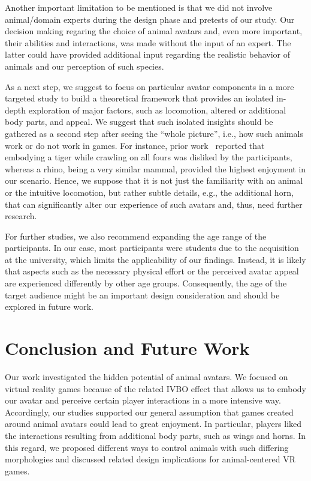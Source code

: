 \documentclass{sigchi}
\begin{document}
Another important limitation to be mentioned is that we did not involve animal/domain experts during the design phase and pretests of our study. Our decision making regaring the choice of animal avatars and, even more important, their abilities and interactions, was made without the input of an expert. The latter could have provided additional input regarding the realistic behavior of animals and our perception of such species.


As a next step, we suggest to focus on particular avatar components in a more targeted study to build a theoretical framework that provides an isolated in-depth exploration of major factors, such as locomotion, altered or additional body parts, and appeal. We suggest that such isolated insights should be gathered as a second step after seeing the “whole picture”, i.e., how such animals work or do not work in games. For instance, prior work~ reported that embodying a tiger while crawling on all fours was disliked by the participants, whereas a rhino, being a very similar mammal, provided the highest enjoyment in our scenario. Hence, we suppose that it is not just the familiarity with an animal or the intuitive locomotion, but rather subtle details, e.g., the additional horn, that can significantly alter our experience of such avatars and, thus, need further research. 


For further studies, we also recommend expanding the age range of the participants. In our case, most participants were students due to the acquisition at the university, which limits the applicability of our findings. Instead, it is likely that aspects such as the necessary physical effort or the perceived avatar appeal are experienced differently by other age groups. Consequently, the age of the target audience might be an important design consideration and should be explored in future work.



\section{Conclusion and Future Work}

Our work investigated the hidden potential of animal avatars. We focused on virtual reality games because of the related IVBO effect that allows us to embody our avatar and perceive certain player interactions in a more intensive way. Accordingly, our studies supported our general assumption that games created around animal avatars could lead to great enjoyment. In particular, players liked the interactions resulting from additional body parts, such as wings and horns. In this regard, we proposed different ways to control animals with such differing morphologies and discussed related design implications for animal-centered VR games. 
\end{document}

